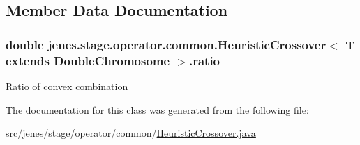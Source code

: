 \subsection{Member Data Documentation}
\hypertarget{classjenes_1_1stage_1_1operator_1_1common_1_1_heuristic_crossover_3_01_t_01extends_01_double_chromosome_01_4_a9cae7cf20e3154743a4dbe53054f513b}{
\subsubsection[{ratio}]{\setlength{\rightskip}{0pt plus 5cm}double jenes.\-stage.\-operator.\-common.\-Heuristic\-Crossover$<$ T extends {\bf Double\-Chromosome} $>$.ratio\hspace{0.3cm}{\ttfamily [protected]}}}\label{classjenes_1_1stage_1_1operator_1_1common_1_1_heuristic_crossover_3_01_t_01extends_01_double_chromosome_01_4_a9cae7cf20e3154743a4dbe53054f513b}
Ratio of convex combination 

The documentation for this class was generated from the following file\-:\begin{DoxyCompactItemize}
\item 
src/jenes/stage/operator/common/\hyperlink{_heuristic_crossover_8java}{Heuristic\-Crossover.\-java}\end{DoxyCompactItemize}
